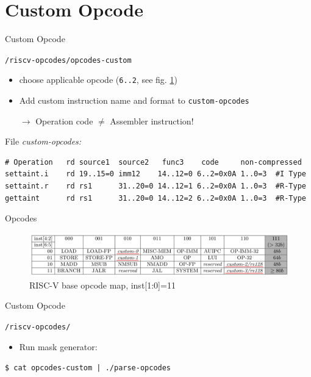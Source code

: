 \documentclass[aspectratio=169]{CPS-Beamer}
\begin{document}
\section{Custom Opcode}
\begin{frame}[fragile]{Custom Opcode}
	\begin{block}{\texttt{/riscv-opcodes/opcodes-custom}}
		\begin{itemize}
			\item choose applicable opcode (\texttt{6..2}, see fig. \ref{opcodes})
			\item Add custom instruction name and format to \texttt{custom-opcodes}
			\item[$\rightarrow$] Operation code $\neq$ Assembler instruction!
		\end{itemize}
File \textit{custom-opcodes:}
\begin{verbatim}
# Operation   rd source1  source2   func3    code     non-compressed
settaint.i    rd 19..15=0 imm12    14..12=0 6..2=0x0A 1..0=3  #I Type
settaint.r    rd rs1      31..20=0 14..12=1 6..2=0x0A 1..0=3  #R-Type
gettaint      rd rs1      31..20=0 14..12=2 6..2=0x0A 1..0=3  #R-Type
\end{verbatim}
\end{block}
\end{frame}


\begin{frame}{Opcodes}%
	\vspace{1em}
	\begin{figure}
		\includegraphics[width=\textwidth]{opcode_map.png}
		\caption{\label{opcodes}RISC-V base opcode map, inst[1:0]=11}
	\end{figure}
\end{frame}

\begin{frame}[fragile]{Custom Opcode}
	\begin{block}{\texttt{/riscv-opcodes/}}
		\begin{itemize}
			\item Run mask generator:
		\end{itemize}
\texttt{\$ cat opcodes-custom | ./parse-opcodes}
\end{block}
\end{frame}
\end{document}
